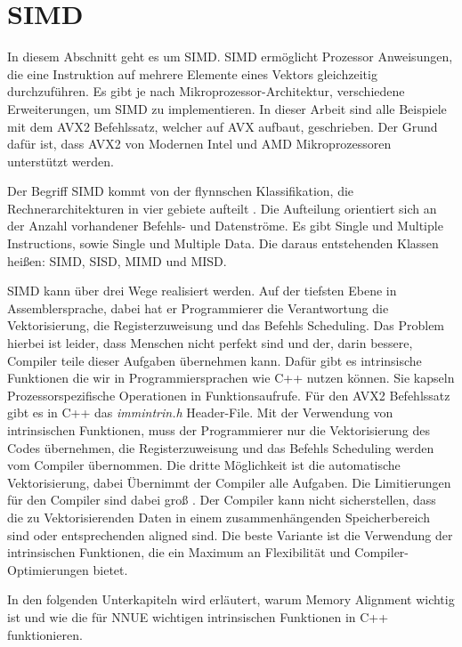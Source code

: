 \section{SIMD}

In diesem Abschnitt geht es um \ac{SIMD}. \ac{SIMD} ermöglicht Prozessor Anweisungen, die eine Instruktion auf mehrere Elemente eines Vektors gleichzeitig durchzuführen. Es gibt je nach Mikroprozessor-Architektur, verschiedene Erweiterungen, um \ac{SIMD} zu implementieren. In dieser Arbeit sind alle Beispiele mit dem \ac{AVX2} Befehlssatz, welcher auf \ac{AVX} aufbaut, geschrieben. Der Grund dafür ist, dass \ac{AVX2} von Modernen Intel und AMD Mikroprozessoren unterstützt werden.

Der Begriff \ac{SIMD} kommt von der flynnschen Klassifikation, die Rechnerarchitekturen in vier gebiete aufteilt \cite{Flynn1972}. Die Aufteilung orientiert sich an der Anzahl vorhandener Befehls- und Datenströme. Es gibt Single und Multiple Instructions, sowie Single und Multiple Data. Die daraus entstehenden Klassen heißen: \ac{SIMD}, \ac{SISD}, \ac{MIMD} und \ac{MISD}.

\ac{SIMD} kann über drei Wege realisiert werden. Auf der tiefsten Ebene in Assemblersprache, dabei hat er Programmierer die Verantwortung die Vektorisierung, die Registerzuweisung und das Befehls Scheduling. Das Problem hierbei ist leider, dass Menschen nicht perfekt sind und der, darin bessere, Compiler teile dieser Aufgaben übernehmen kann. Dafür gibt es intrinsische Funktionen die wir in Programmiersprachen wie C++ nutzen können. Sie kapseln Prozessorspezifische Operationen in Funktionsaufrufe. Für den \ac{AVX2} Befehlssatz gibt es in C++ das \emph{immintrin.h} Header-File. Mit der Verwendung von intrinsischen Funktionen, muss der Programmierer nur die Vektorisierung des Codes übernehmen, die Registerzuweisung und das Befehls Scheduling werden vom Compiler übernommen. Die dritte Möglichkeit ist die automatische Vektorisierung, dabei Übernimmt der Compiler alle Aufgaben. Die Limitierungen für den Compiler sind dabei groß \cite{ren2003preliminary}. Der Compiler kann nicht sicherstellen, dass die zu Vektorisierenden Daten in einem zusammenhängenden Speicherbereich sind oder entsprechenden aligned sind. Die beste Variante ist die Verwendung der intrinsischen Funktionen, die ein Maximum an Flexibilität und Compiler-Optimierungen bietet.

In den folgenden Unterkapiteln wird erläutert, warum Memory Alignment wichtig ist und wie die für \ac{NNUE} wichtigen intrinsischen Funktionen in C++ funktionieren.

